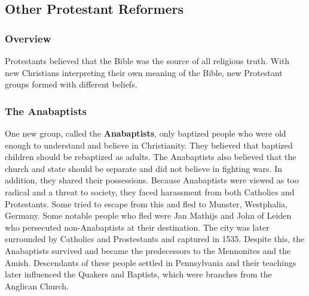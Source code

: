 \documentclass[11pt]{article}
\begin{document}
\subsection{Other Protestant Reformers}
\label{sec:orgde176fe}
\subsubsection{Overview}
\label{sec:org83319e1}
Protestants believed that the Bible was the source of all religious truth. With new Christians interpreting their own meaning of the Bible, new Protestant groups formed with different beliefs.
\subsubsection{The Anabaptists}
\label{sec:org42cad14}
One new group, called the \textbf{Anabaptists}, only baptized people who were old enough to understand and believe in Christianity. They believed that baptized children should be rebaptized as adults. The Anabaptists also believed that the church and state should be separate and did not believe in fighting wars. In addition, they shared their possessions. Because Anabaptists were viewed as too radical and a threat to society, they faced harassment from both Catholics and Protestants. Some tried to escape from this and fled to Munster, Westphalia, Germany. Some notable people who fled were Jan Mathijs and John of Leiden who persecuted non-Anabaptists at their destination. The city was later surrounded by Catholics and Prostestants and captured in 1535. Despite this, the Anabaptists survived and became the predecessors to the Mennonites and the Amish. Descendants of these people settled in Pennsylvania and their teachings later influenced the Quakers and Baptists, which were branches from the Anglican Church.
\end{document}
